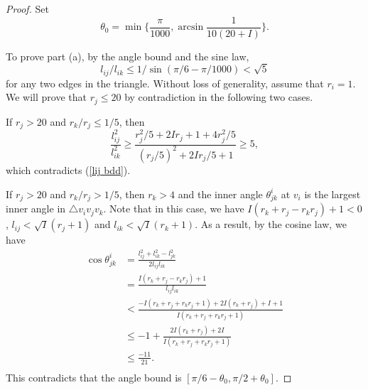 \documentclass[12pt]{amsart}
\begin{document}
\begin{proof}
    Set $$\theta_{0} = \min \{\frac{\pi}{1000}, \arcsin \frac{1}{10(20+I)}\}.$$


	To prove part (a), by the angle bound and the sine law,
\begin{equation}\label{lij bdd}
  l_{ij}/l_{ik}\leq 1 /\sin (\pi /6 - \pi /1000)< \sqrt{5}
\end{equation}
 for any two edges in the triangle.
 Without loss of generality, assume that $r_i = 1$. We will prove that $r_j\leq 20$ by contradiction in the following two cases.
	
	If $r_j>20$ and $r_k/r_j\leq 1/5$, then
	$$\frac{l_{ij}^2}{l_{ik}^2} \geq \frac{r_j^2/5 + 2Ir_j+ 1+  4r_j^2/5}{(r_j/5)^2 + 2Ir_j/5+ 1} \geq 5,$$
	which contradicts (\ref{lij bdd}).
	
	If $r_j>20$ and $r_k/r_j> 1/5$, then $r_k>4$ and the inner angle $\theta_{jk}^i$ at $v_i$ is the largest inner angle in $\triangle v_iv_jv_k$.
Note that in this case, we have $I({r_k} + {r_j} - {r_k}{r_j}) + 1<0$, $l_{ij}<\sqrt{I}(r_j+1)$ and $l_{ik}<\sqrt{I}(r_k+1)$.
As a result, by the cosine law, we have
	    $$
	\begin{aligned}
		\cos \theta _{jk}^i &  = \frac{{l_{ij}^2 + l_{ik}^2 - l_{jk}^2}}{{2{l_{ij}}{l_{ik}}}} \\
&= \frac{{I({r_k} + {r_j} - {r_k}{r_j}) + 1}}{{{l_{ij}}{l_{ik}}}} \\
		&  < \frac{{ - I({r_k} + {r_j} + {r_k}{r_j} + 1) + 2I({r_k} + {r_j}) + I + 1}}{{I({r_k} + {r_j} + {r_k}{r_j} + 1)}}
		\\
		& \le   - 1 + \frac{{2I({r_k} + {r_j}) + 2I}}{{I({r_k} + {r_j} + {r_k}{r_j} + 1)}}\\
& \le \frac{{ - 11}}{{21}}.\\
	\end{aligned}
	$$
	This contradicts that the angle bound is $[\pi /6 - \theta_0,  \pi/2 + \theta_0]$.

	
	

\end{proof}
\end{document}
